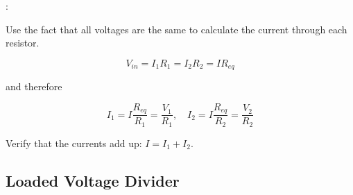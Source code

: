 \documentclass[handout]{beamer}
\begin{document}
\begin{frame}{\secname : \subsecname}

Use the fact that all voltages are the same to calculate the current through each resistor.

\begin{equation}
    V_{in} = I_1 R_1 = I_2 R_2 = I R_{eq}
\end{equation}

and therefore

\begin{equation}
    I_1 = I \dfrac{R_{eq}}{R_1} = \dfrac{V_1}{R_1}, \quad I_2 = I \dfrac{R_{eq}}{R_2} = \dfrac{V_2}{R_2}
\end{equation}

\vspace{0.5 cm}

\begin{figure}
\end{figure} 

Verify that the currents add up: $I = I_1 + I_2$.

\end{frame}

\subsection{Loaded Voltage Divider}
\end{document}
